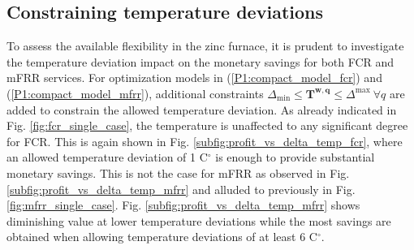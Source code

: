 \documentclass[conference]{IEEEtran}
\begin{document}
\subsection{Constraining temperature deviations}
\vspace{-1mm}
To assess the available flexibility in the zinc furnace, it is prudent to investigate the temperature deviation impact on the monetary savings for both FCR and mFRR services. For optimization models in (\ref{P1:compact_model_fcr}) and (\ref{P1:compact_model_mfrr}), additional constraints $ \Delta_{\text{min}} \leq \bm{T^{w,q}} \leq \Delta^{\text{max}} \ \forall{q}$ are added to constrain the allowed temperature deviation.
%
As already indicated  in Fig. \ref{fig:fcr_single_case}, the temperature is unaffected to any significant degree for FCR. This is again shown in Fig. \ref{subfig:profit_vs_delta_temp_fcr}, where an allowed temperature deviation of 1 C$^{\circ}$ is enough to provide substantial monetary savings. This is not the case for mFRR as observed in Fig. \ref{subfig:profit_vs_delta_temp_mfrr} and alluded to previously in Fig. \ref{fig:mfrr_single_case}. Fig. \ref{subfig:profit_vs_delta_temp_mfrr} shows diminishing value at lower temperature deviations while the most savings are obtained when allowing temperature deviations of at least 6 C$^{\circ}$.





\end{document}

